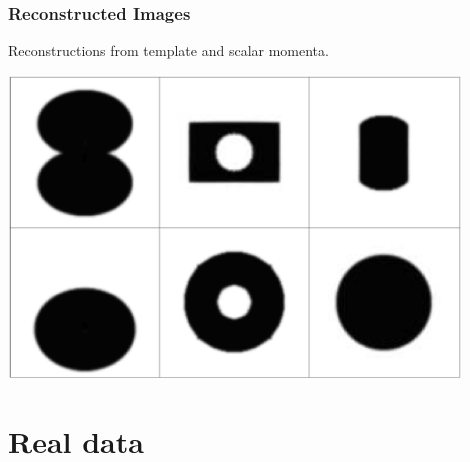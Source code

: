 \documentclass{beamer}
\begin{document}
\begin{frame}
\frametitle{Reconstructed Images}
Reconstructions from template and scalar momenta.
\begin{center}
\includegraphics[width=0.9\textwidth]{reconstructed}
\end{center}
\end{frame}





\section{Real data}
\end{document}
